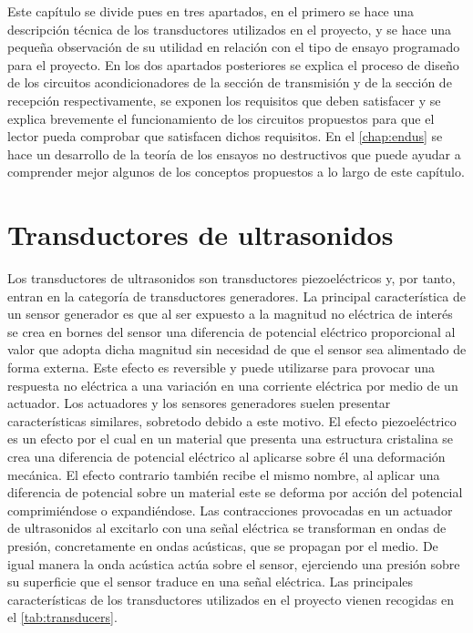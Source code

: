 Este capítulo se divide pues en tres apartados, en el primero se hace una
descripción técnica de los transductores utilizados en el proyecto, y se
hace una pequeña observación de su utilidad en relación con el tipo de
ensayo programado para el proyecto. En los dos apartados posteriores se
explica el proceso de diseño de los circuitos acondicionadores de la
sección de transmisión y de la sección de recepción respectivamente, se
exponen los requisitos que deben satisfacer y se explica brevemente el
funcionamiento de los circuitos propuestos para que el lector pueda
comprobar que satisfacen dichos requisitos. En el \cref{chap:endus} se hace
un desarrollo de la teoría de los ensayos no destructivos que puede ayudar
a comprender mejor algunos de los conceptos propuestos a lo largo de este
capítulo.


\section{Transductores de ultrasonidos}

Los transductores de ultrasonidos son transductores piezoeléctricos y, por
tanto, entran en la categoría de transductores generadores. La principal
característica de un sensor generador es que al ser expuesto a la magnitud
no eléctrica de interés se crea en bornes del sensor una diferencia de
potencial eléctrico proporcional al valor que adopta dicha magnitud sin
necesidad de que el sensor sea alimentado de forma externa. Este efecto es
reversible y puede utilizarse para provocar una respuesta no eléctrica a
una variación en una corriente eléctrica por medio de un actuador. Los
actuadores y los sensores generadores suelen presentar características
similares, sobretodo debido a este motivo. El efecto piezoeléctrico es un
efecto por el cual en un material que presenta una estructura cristalina se
crea una diferencia de potencial eléctrico al aplicarse sobre él una
deformación mecánica. El efecto contrario también recibe el mismo nombre,
al aplicar una diferencia de potencial sobre un material este se deforma
por acción del potencial comprimiéndose o expandiéndose. Las contracciones
provocadas en un actuador de ultrasonidos al excitarlo con una señal
eléctrica se transforman en ondas de presión, concretamente en ondas
acústicas, que se propagan por el medio. De igual manera la onda acústica
actúa sobre el sensor, ejerciendo una presión sobre su superficie que el
sensor traduce en una señal eléctrica. Las principales características de
los transductores utilizados en el proyecto vienen recogidas en el
\cref{tab:transducers}.


